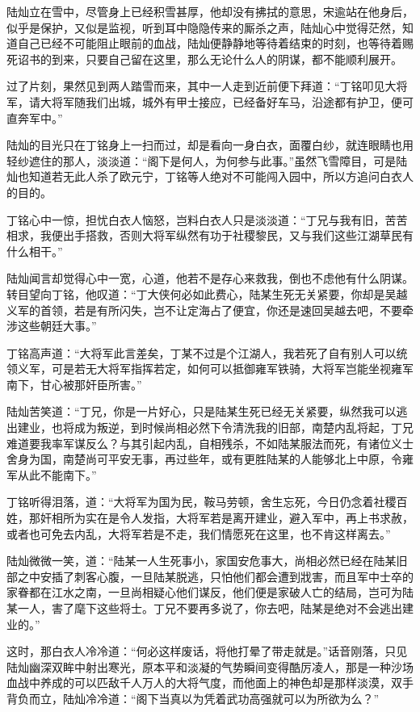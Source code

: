 陆灿立在雪中，尽管身上已经积雪甚厚，他却没有拂拭的意思，宋逾站在他身后，似乎是保护，又似是监视，听到耳中隐隐传来的厮杀之声，陆灿心中觉得茫然，知道自己已经不可能阻止眼前的血战，陆灿便静静地等待着结束的时刻，也等待着赐死诏书的到来，只要自己留在这里，那么无论什么人的阴谋，都不能顺利展开。

过了片刻，果然见到两人踏雪而来，其中一人走到近前便下拜道：“丁铭叩见大将军，请大将军随我们出城，城外有甲士接应，已经备好车马，沿途都有护卫，便可直奔军中。”

陆灿的目光只在丁铭身上一扫而过，却是看向一身白衣，面覆白纱，就连眼睛也用轻纱遮住的那人，淡淡道：“阁下是何人，为何参与此事。”虽然飞雪障目，可是陆灿也知道若无此人杀了欧元宁，丁铭等人绝对不可能闯入园中，所以方追问白衣人的目的。

丁铭心中一惊，担忧白衣人恼怒，岂料白衣人只是淡淡道：“丁兄与我有旧，苦苦相求，我便出手搭救，否则大将军纵然有功于社稷黎民，又与我们这些江湖草民有什么相干。”

陆灿闻言却觉得心中一宽，心道，他若不是存心来救我，倒也不虑他有什么阴谋。转目望向丁铭，他叹道：“丁大侠何必如此费心，陆某生死无关紧要，你却是吴越义军的首领，若是有所闪失，岂不让定海占了便宜，你还是速回吴越去吧，不要牵涉这些朝廷大事。”

丁铭高声道：“大将军此言差矣，丁某不过是个江湖人，我若死了自有别人可以统领义军，可是若无大将军指挥若定，如何可以抵御雍军铁骑，大将军岂能坐视雍军南下，甘心被那奸臣所害。”

陆灿苦笑道：“丁兄，你是一片好心，只是陆某生死已经无关紧要，纵然我可以逃出建业，也将成为叛逆，到时候尚相必然下令清洗我的旧部，南楚内乱将起，丁兄难道要我率军谋反么？与其引起内乱，自相残杀，不如陆某服法而死，有诸位义士舍身为国，南楚尚可平安无事，再过些年，或有更胜陆某的人能够北上中原，令雍军从此不能南下。”

丁铭听得泪落，道：“大将军为国为民，鞍马劳顿，舍生忘死，今日仍念着社稷百姓，那奸相所为实在是令人发指，大将军若是离开建业，避入军中，再上书求赦，或者也可免去内乱，大将军若是不走，我们情愿死在这里，也不肯这样离去。”

陆灿微微一笑，道：“陆某一人生死事小，家国安危事大，尚相必然已经在陆某旧部之中安插了刺客心腹，一旦陆某脱逃，只怕他们都会遭到戕害，而且军中士卒的家眷都在江水之南，一旦尚相疑心他们谋反，他们便是家破人亡的结局，岂可为陆某一人，害了麾下这些将士。丁兄不要再多说了，你去吧，陆某是绝对不会逃出建业的。”

这时，那白衣人冷冷道：“何必这样废话，将他打晕了带走就是。”话音刚落，只见陆灿幽深双眸中射出寒光，原本平和淡凝的气势瞬间变得酷厉凌人，那是一种沙场血战中养成的可以匹敌千人万人的大将气度，而他面上的神色却是那样淡漠，双手背负而立，陆灿冷冷道：“阁下当真以为凭着武功高强就可以为所欲为么？”


